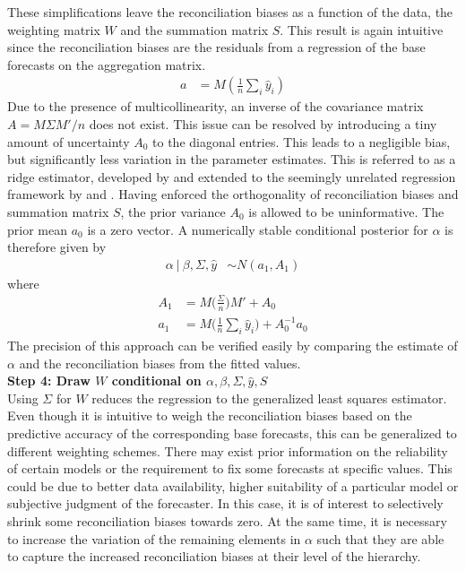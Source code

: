\documentclass[a4paper,fleqn,11pt]{article}
\begin{document}
These simplifications leave the reconciliation biases as a function of the data, the weighting matrix $W$ and the summation matrix $S$. This result is again intuitive since the reconciliation biases are the residuals from a regression of the base forecasts on the aggregation matrix.
\begin{align}
a &= M\left(\frac{1}{n}\sum_i \hat{y}_i\right)
\end{align}
Due to the presence of multicollinearity, an inverse of the covariance matrix $A = M\Sigma M'/n$ does not exist. This issue can be resolved by introducing a tiny amount of uncertainty $A_0$  to the diagonal entries. This leads to a negligible bias, but significantly less variation in the parameter estimates. This is referred to as a ridge estimator, developed by \cite{Brown1980} and extended to the seemingly unrelated regression framework by \cite{Haitovsky1987} and \cite{Firinguetti1997}. Having enforced the orthogonality of reconciliation biases and summation matrix $S$, the prior variance $A_0$ is allowed to be uninformative. The prior mean $a_0$ is a zero vector. A numerically stable conditional posterior for $\alpha$ is therefore given by
\begin{align}
	\label{eq:alpha}
	\alpha\ |\ \beta,\Sigma,\hat{y} &\sim N(a_1,A_1)
\end{align}
where
\begin{align*}
	A_1 &= M\Bigg(\frac{\Sigma}{n}\Bigg)M' + A_0\\
	a_1 &= M\Bigg(\frac{1}{n}\sum_i \hat{y}_i\Bigg) + A_0^{-1}a_0
\end{align*}
The precision of this approach can be verified easily by comparing the estimate of $\alpha$ and the reconciliation biases from the fitted values. \\

\noindent\textbf{Step 4: Draw $W$ conditional on $\alpha,\beta,\Sigma,\hat{y},S$}\\
Using $\Sigma$ for $W$ reduces the regression to the generalized least squares estimator. Even though it is intuitive to weigh the reconciliation biases based on the predictive accuracy of the corresponding base forecasts, this can be generalized to different weighting schemes. There may exist prior information on the reliability of certain models or the requirement to fix some forecasts at specific values. This could be due to better data availability, higher suitability of a particular model or subjective judgment of the forecaster.  In this case, it is of interest to selectively shrink some reconciliation biases towards zero. At the same time, it is necessary to increase the variation of the remaining elements in $\alpha$ such that they are able to capture the increased reconciliation biases at their level of the hierarchy.
\end{document}
